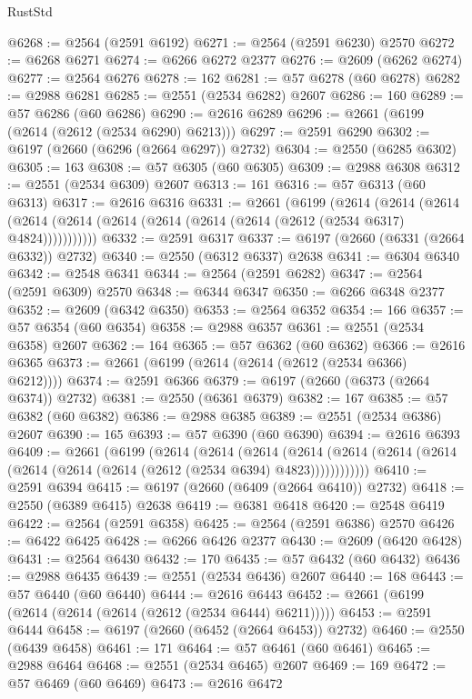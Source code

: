 \begin{lexlean}{RustStd}
\begin{coremodule}
@6268 := @2564 (@2591 @6192)
@6271 := @2564 (@2591 @6230) @2570
@6272 := @6268 @6271
@6274 := @6266 @6272 @2377
@6276 := @2609 (@6262 @6274)
@6277 := @2564 @6276
@6278 := 162
@6281 := @57 @6278 (@60 @6278)
@6282 := @2988 @6281
@6285 := @2551 (@2534 @6282) @2607
@6286 := 160
@6289 := @57 @6286 (@60 @6286)
@6290 := @2616 @6289
@6296 := @2661 (@6199 (@2614 (@2612 (@2534 @6290) @6213)))
@6297 := @2591 @6290
@6302 := @6197 (@2660 (@6296 (@2664 @6297)) @2732)
@6304 := @2550 (@6285 @6302)
@6305 := 163
@6308 := @57 @6305 (@60 @6305)
@6309 := @2988 @6308
@6312 := @2551 (@2534 @6309) @2607
@6313 := 161
@6316 := @57 @6313 (@60 @6313)
@6317 := @2616 @6316
@6331 := @2661
    (@6199
      (@2614
        (@2614
          (@2614 (@2614 (@2614 (@2614 (@2614 (@2614 (@2614 (@2612 (@2534 @6317) @4824)))))))))))
@6332 := @2591 @6317
@6337 := @6197 (@2660 (@6331 (@2664 @6332)) @2732)
@6340 := @2550 (@6312 @6337) @2638
@6341 := @6304 @6340
@6342 := @2548 @6341
@6344 := @2564 (@2591 @6282)
@6347 := @2564 (@2591 @6309) @2570
@6348 := @6344 @6347
@6350 := @6266 @6348 @2377
@6352 := @2609 (@6342 @6350)
@6353 := @2564 @6352
@6354 := 166
@6357 := @57 @6354 (@60 @6354)
@6358 := @2988 @6357
@6361 := @2551 (@2534 @6358) @2607
@6362 := 164
@6365 := @57 @6362 (@60 @6362)
@6366 := @2616 @6365
@6373 := @2661 (@6199 (@2614 (@2614 (@2612 (@2534 @6366) @6212))))
@6374 := @2591 @6366
@6379 := @6197 (@2660 (@6373 (@2664 @6374)) @2732)
@6381 := @2550 (@6361 @6379)
@6382 := 167
@6385 := @57 @6382 (@60 @6382)
@6386 := @2988 @6385
@6389 := @2551 (@2534 @6386) @2607
@6390 := 165
@6393 := @57 @6390 (@60 @6390)
@6394 := @2616 @6393
@6409 := @2661
    (@6199
      (@2614
        (@2614
          (@2614
            (@2614 (@2614 (@2614 (@2614 (@2614 (@2614 (@2614 (@2612 (@2534 @6394) @4823))))))))))))
@6410 := @2591 @6394
@6415 := @6197 (@2660 (@6409 (@2664 @6410)) @2732)
@6418 := @2550 (@6389 @6415) @2638
@6419 := @6381 @6418
@6420 := @2548 @6419
@6422 := @2564 (@2591 @6358)
@6425 := @2564 (@2591 @6386) @2570
@6426 := @6422 @6425
@6428 := @6266 @6426 @2377
@6430 := @2609 (@6420 @6428)
@6431 := @2564 @6430
@6432 := 170
@6435 := @57 @6432 (@60 @6432)
@6436 := @2988 @6435
@6439 := @2551 (@2534 @6436) @2607
@6440 := 168
@6443 := @57 @6440 (@60 @6440)
@6444 := @2616 @6443
@6452 := @2661 (@6199 (@2614 (@2614 (@2614 (@2612 (@2534 @6444) @6211)))))
@6453 := @2591 @6444
@6458 := @6197 (@2660 (@6452 (@2664 @6453)) @2732)
@6460 := @2550 (@6439 @6458)
@6461 := 171
@6464 := @57 @6461 (@60 @6461)
@6465 := @2988 @6464
@6468 := @2551 (@2534 @6465) @2607
@6469 := 169
@6472 := @57 @6469 (@60 @6469)
@6473 := @2616 @6472

\end{coremodule}
\end{lexlean}
